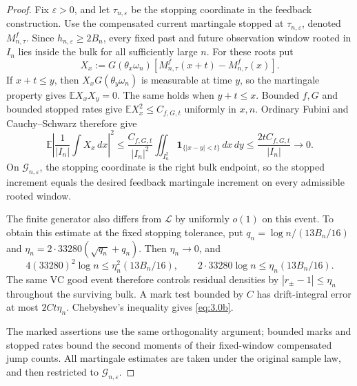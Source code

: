 \documentclass[11pt,reqno]{amsart}
\theoremstyle{definition}
\theoremstyle{remark}
\numberwithin{equation}{section}
\newcommand{\E}{\mathbb E}
\begin{document}
\begin{proof}
Fix \(\varepsilon>0\), and let \(\tau_{n,\varepsilon}\) be the stopping
coordinate in the feedback construction.  Use the compensated current
martingale stopped at \(\tau_{n,\varepsilon}\), denoted
\(M_{n,\tau}^f\).  Since \(h_{n,\varepsilon}\ge2B_n\), every fixed
past and future observation window rooted in \(I_n\) lies inside the
bulk for all sufficiently large \(n\).  For these roots put
\begin{equation}
X_x:=G(\theta_x\omega_n)
[M_{n,\tau}^f(x+t)-M_{n,\tau}^f(x)].
\label{eq:3.0c}
\end{equation}
If \(x+t\le y\), then \(X_xG(\theta_y\omega_n)\) is measurable
at time \(y\), so the martingale property gives \(\E X_xX_y=0\).
The same holds when \(y+t\le x\).  Bounded \(f,G\) and bounded
stopped rates give \(\E X_x^2\le C_{f,G,t}\) uniformly in \(x,n\).
Ordinary Fubini and Cauchy--Schwarz therefore give
\begin{equation}
\E\left|\frac1{|I_n|}\int X_x\,dx\right|^2
\le\frac{C_{f,G,t}}{|I_n|^2}
\iint_{I_n^2}\mathbf1_{\{|x-y|<t\}}\,dx\,dy
\le\frac{2tC_{f,G,t}}{|I_n|}\longrightarrow0.
\label{eq:3.0d}
\end{equation}
On \(\mathcal G_{n,\varepsilon}\), the stopping coordinate is the right
bulk endpoint, so the stopped increment equals the desired feedback
martingale increment on every admissible rooted window.

The finite generator also differs from \(\mathcal L\) by uniformly
\(o(1)\) on this event.  To obtain this estimate at the fixed stopping tolerance,
put \(q_n=\log n/(13B_n/16)\) and
\(\eta_n=2\cdot33280(\sqrt{q_n}+q_n)\).  Then \(\eta_n\to0\), and
\[
4(33280)^2\log n\le\eta_n^2(13B_n/16),\qquad
2\cdot33280\log n\le\eta_n(13B_n/16).
\]
The same VC good event therefore controls residual densities by
\(|r_\pm-1|\le\eta_n\) throughout the surviving bulk.  A mark test
bounded by \(C\) has drift-integral error at most \(2Ct\eta_n\).
Chebyshev's inequality gives \eqref{eq:3.0b}.

The marked assertions use the same orthogonality argument;
bounded marks and stopped rates bound the second moments of their
fixed-window compensated jump counts.  All martingale estimates are
taken under the original sample law, and then restricted to
\(\mathcal G_{n,\varepsilon}\).
\end{proof}
\end{document}
